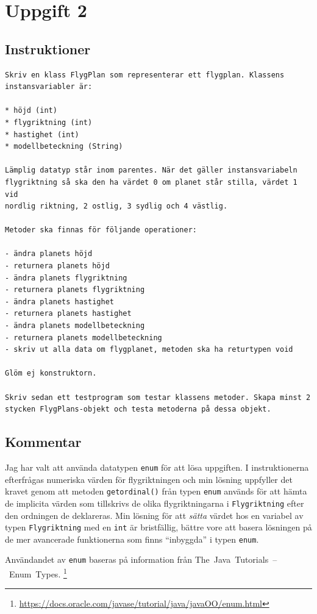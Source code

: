 \section{Uppgift 2}\label{sec:uppg02}

\subsection{Instruktioner}
\begin{verbatim}
Skriv en klass FlygPlan som representerar ett flygplan. Klassens
instansvariabler är:

* höjd (int)
* flygriktning (int)
* hastighet (int)
* modellbeteckning (String)

Lämplig datatyp står inom parentes. När det gäller instansvariabeln
flygriktning så ska den ha värdet 0 om planet står stilla, värdet 1 vid
nordlig riktning, 2 ostlig, 3 sydlig och 4 västlig.

Metoder ska finnas för följande operationer:

- ändra planets höjd
- returnera planets höjd
- ändra planets flygriktning
- returnera planets flygriktning
- ändra planets hastighet
- returnera planets hastighet
- ändra planets modellbeteckning
- returnera planets modellbeteckning
- skriv ut alla data om flygplanet, metoden ska ha returtypen void

Glöm ej konstruktorn.

Skriv sedan ett testprogram som testar klassens metoder. Skapa minst 2
stycken FlygPlans-objekt och testa metoderna på dessa objekt.
\end{verbatim}


\subsection{Kommentar}
Jag har valt att använda datatypen \texttt{enum} för att lösa uppgiften.  I
instruktionerna efterfrågas numeriska värden för flygriktningen och min lösning
uppfyller det kravet genom att metoden \texttt{getordinal()} från typen
\texttt{enum} används för att hämta de implicita värden som tillskrivs de olika
flygriktningarna i \texttt{Flygriktning} efter den ordningen de deklareras.
Min lösning för att \emph{sätta} värdet hos en variabel av typen
\texttt{Flygriktning} med en \texttt{int} är bristfällig, bättre vore att
basera lösningen på de mer avancerade funktionerna som finns ``inbyggda'' i
typen \texttt{enum}.

Användandet av \texttt{enum} baseras på information från
\mbox{The Java Tutorials -- Enum Types}.
\footnote{\url{https://docs.oracle.com/javase/tutorial/java/javaOO/enum.html}}


